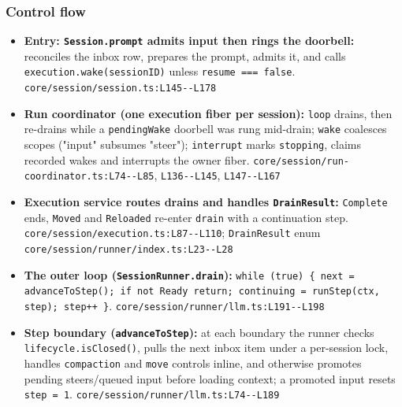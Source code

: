 \subsubsection*{Control flow}
\begin{itemize}
\item \textbf{Entry: \texttt{Session.\allowbreak{}prompt} admits input then rings the doorbell:} reconciles the inbox row, prepares the prompt, admits it, and calls \texttt{execution.\allowbreak{}wake(\allowbreak{}sessionID)} unless \texttt{resume === false}. \texttt{core/\allowbreak{}session/\allowbreak{}session.\allowbreak{}ts:\allowbreak{}L145-\allowbreak{}-\allowbreak{}L178}
\item \textbf{Run coordinator (one execution fiber per session):} \texttt{loop} drains, then re-drains while a \texttt{pendingWake} doorbell was rung mid-drain; \texttt{wake} coalesces scopes ("input" subsumes "steer"); \texttt{interrupt} marks \texttt{stopping}, claims recorded wakes and interrupts the owner fiber. \texttt{core/\allowbreak{}session/\allowbreak{}run-\allowbreak{}coordinator.\allowbreak{}ts:\allowbreak{}L74-\allowbreak{}-\allowbreak{}L85}, \texttt{L136-\allowbreak{}-\allowbreak{}L145}, \texttt{L147-\allowbreak{}-\allowbreak{}L167}
\item \textbf{Execution service routes drains and handles \texttt{DrainResult}:} \texttt{Complete} ends, \texttt{Moved} and \texttt{Reloaded} re-enter \texttt{drain} with a continuation step. \texttt{core/\allowbreak{}session/\allowbreak{}execution.\allowbreak{}ts:\allowbreak{}L87-\allowbreak{}-\allowbreak{}L110}; \texttt{DrainResult} enum \texttt{core/\allowbreak{}session/\allowbreak{}runner/\allowbreak{}index.\allowbreak{}ts:\allowbreak{}L23-\allowbreak{}-\allowbreak{}L28}
\item \textbf{The outer loop (\texttt{SessionRunner.\allowbreak{}drain}):} \texttt{while (\allowbreak{}true) \{ next = advanceToStep(\allowbreak{}); if not Ready return; continuing = runStep(\allowbreak{}ctx, step); step++ \}}. \texttt{core/\allowbreak{}session/\allowbreak{}runner/\allowbreak{}llm.\allowbreak{}ts:\allowbreak{}L191-\allowbreak{}-\allowbreak{}L198}
\item \textbf{Step boundary (\texttt{advanceToStep}):} at each boundary the runner checks \texttt{lifecycle.\allowbreak{}isClosed(\allowbreak{})}, pulls the next inbox item under a per-session lock, handles \texttt{compaction} and \texttt{move} controls inline, and otherwise promotes pending steers/queued input before loading context; a promoted input resets \texttt{step = 1}. \texttt{core/\allowbreak{}session/\allowbreak{}runner/\allowbreak{}llm.\allowbreak{}ts:\allowbreak{}L74-\allowbreak{}-\allowbreak{}L189}

\end{itemize}
